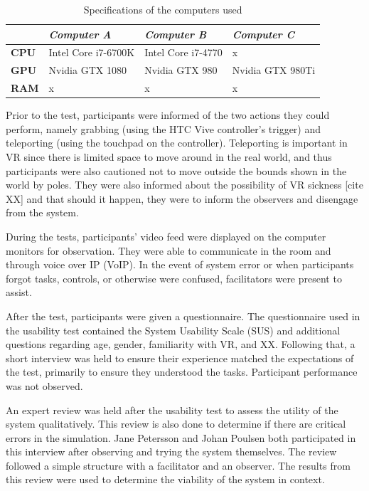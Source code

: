 \documentclass[conference]{IEEEtran}
\begin{document}
\begin{table}
\centering
\begin{tabularx}{0.48\textwidth}{X X X X}
\toprule
                     & \textit{Computer A} & \textit{Computer B} & \textit{Computer C} \\ \midrule \rowcolor{lightGrey}
\textbf{CPU}         & Intel Core i7-6700K & Intel Core i7-4770  & x                   \\

\textbf{GPU}         & Nvidia GTX 1080     & Nvidia GTX 980      & Nvidia GTX 980Ti    \\  \rowcolor{lightGrey}

\textbf{RAM} 		 & x                   & x                   & x                   \\ \toprule
\end{tabularx}
\caption{Specifications of the computers used}
\label{tab:specs}
\end{table}

Prior to the test, participants were informed of the two actions they could perform, namely grabbing (using the HTC Vive controller's trigger) and teleporting (using the touchpad on the controller). Teleporting is important in VR since there is limited space to move around in the real world, and thus participants were also cautioned not to move outside the bounds shown in the world by poles. They were also informed about the possibility of VR sickness [cite XX] and that should it happen, they were to inform the observers and disengage from the system.

During the tests, participants' video feed were displayed on the computer monitors for observation. They were able to communicate in the room and through voice over IP (VoIP). In the event of system error or when participants forgot tasks, controls, or otherwise were confused, facilitators were present to assist. 

After the test, participants were given a questionnaire. The questionnaire used in the usability test contained the System Usability Scale (SUS) and additional questions regarding age, gender, familiarity with VR, and XX. Following that, a short interview was held to ensure their experience matched the expectations of the test, primarily to ensure they understood the tasks. Participant performance was not observed.

An expert review was held after the usability test to assess the utility of the system qualitatively. This review is also done to determine if there are critical errors in the simulation. Jane Petersson and Johan Poulsen both participated in this interview after observing and trying the system themselves. The review followed a simple structure with a facilitator and an observer. The results from this review were used to determine the viability of the system in context.
\end{document}
